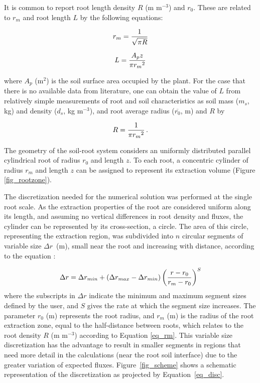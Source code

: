 It is common to report root length density $R$ (m m$^{-3}$) and $r_0$. These are related to $r_m$ and root length $L$ \uhead by the following equations:

\begin{equation}
\label{eq_rm}
r_m = {1 \over \sqrt{\pi R}}
\end{equation}

\begin{equation}
\label{eq_L}
L = {A_p z \over \pi {r_m}^2}
\end{equation}

where $A_p$ (m$^2$) is the soil surface area occupied by the plant. For the case that there is no available data from literature, one can obtain the value of $L$ from relatively simple measurements of root and soil characteristics as soil mass ($m_s$, kg) and density ($d_s$, kg m$^{-3}$), and root average radius ($\overline{r_0}$, m)
and $R$ by

\begin{equation}
\label{eq_R}
R = {1 \over \pi {r_m}^2}\,.
\end{equation}


The geometry of the soil-root system considers an uniformly distributed parallel cylindrical root of radius $r_0$ and length $z$. 
To each root, a concentric cylinder of radius $r_m$ and length $z$ can be assigned to represent its extraction volume (Figure \ref{fig_rootzone}).

The discretization needed for the numerical solution was performed at the single root scale. 
As the extraction properties of the root are considered uniform along its length, and assuming no vertical differences in root density and fluxes, the cylinder can be represented by its cross-section, a circle. 
The area of this circle, representing the extraction region, was subdivided into $n$ circular segments of variable size $\Delta r$~(m), small near the root and increasing with distance, according to the equation \cite{liersolute}:

\begin{equation}
\label{eq_disc}
\Delta r = \Delta r_{min}+(\Delta r_{max}-\Delta r_{min}) \left( {r-r_0 \over r_m-r_0} \right)^S
\end{equation}
%
where the subscripts 
in $\Delta r$ 
indicate the minimum and maximum segment sizes defined by the user, and $S$ gives the rate at which the segment size increases. 
The parameter $r_0$ (m) represents the root radius, and $r_m$ (m) is the radius of the root extraction zone, equal to the half-distance between roots, which relates to the root density $R$ (m m$^{-3}$) according to Equation \ref{eq_rm}.
This variable size discretization has the advantage to result in smaller segments in regions that need more detail in the calculations (near the root soil interface) due to the greater variation of expected fluxes. 
Figure~\ref{fig_scheme} shows a schematic representation of the discretization as projected by Equation~\ref{eq_disc}.

